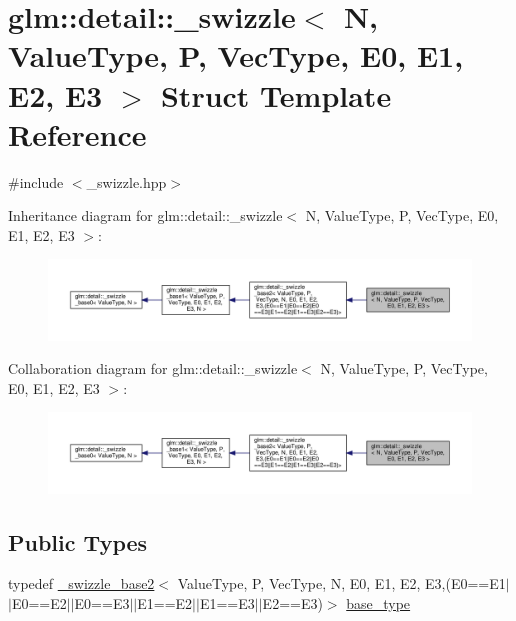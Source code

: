 \hypertarget{structglm_1_1detail_1_1__swizzle}{}\section{glm\+:\+:detail\+:\+:\+\_\+swizzle$<$ N, Value\+Type, P, Vec\+Type, E0, E1, E2, E3 $>$ Struct Template Reference}
\label{structglm_1_1detail_1_1__swizzle}


{\ttfamily \#include $<$\+\_\+swizzle.\+hpp$>$}



Inheritance diagram for glm\+:\+:detail\+:\+:\+\_\+swizzle$<$ N, Value\+Type, P, Vec\+Type, E0, E1, E2, E3 $>$\+:\nopagebreak
\begin{figure}[H]
\begin{center}
\leavevmode
\includegraphics[width=350pt]{structglm_1_1detail_1_1__swizzle__inherit__graph}
\end{center}
\end{figure}


Collaboration diagram for glm\+:\+:detail\+:\+:\+\_\+swizzle$<$ N, Value\+Type, P, Vec\+Type, E0, E1, E2, E3 $>$\+:\nopagebreak
\begin{figure}[H]
\begin{center}
\leavevmode
\includegraphics[width=350pt]{structglm_1_1detail_1_1__swizzle__coll__graph}
\end{center}
\end{figure}
\subsection*{Public Types}
\begin{DoxyCompactItemize}
\item 
typedef \hyperlink{structglm_1_1detail_1_1__swizzle__base2}{\+\_\+swizzle\+\_\+base2}$<$ Value\+Type, P, Vec\+Type, N, E0, E1, E2, E3,(E0==E1$\vert$$\vert$E0==E2$\vert$$\vert$E0==E3$\vert$$\vert$E1==E2$\vert$$\vert$E1==E3$\vert$$\vert$E2==E3)$>$ \hyperlink{structglm_1_1detail_1_1__swizzle_acf7dfa9d7456eb833c247473c5a045f4}{base\+\_\+type}
\end{DoxyCompactItemize}
